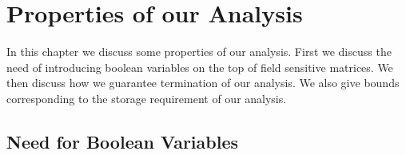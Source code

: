 \chapter{Properties of our Analysis}\label{ch:Properties}

In this chapter we discuss some properties of our analysis. First  we
discuss the need of introducing boolean variables on the top of
field sensitive matrices. We then discuss how we guarantee termination of our analysis. 
We also give bounds corresponding to the storage requirement of our analysis.

\section{Need for Boolean Variables}

